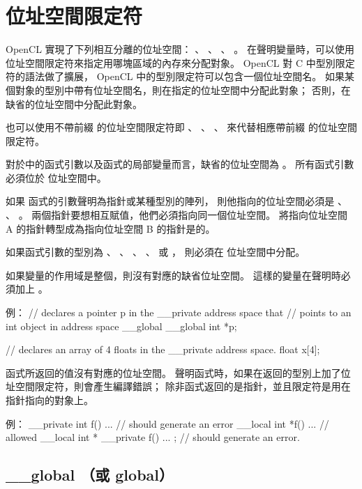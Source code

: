 \section{位址空間限定符}

OpenCL 實現了下列相互分離的位址空間：
 、 、
 、 。
在聲明變量時，可以使用位址空間限定符來指定用哪塊區域的內存來分配對象。
 OpenCL 對 C 中型別限定符的語法做了擴展， OpenCL 中的型別限定符可以包含一個位址空間名。
如果某個對象的型別中帶有位址空間名，則在指定的位址空間中分配此對象；
否則，在缺省的位址空間中分配此對象。

也可以使用不帶前綴 \cqlf{__} 的位址空間限定符即
 、 、 、 
 來代替相應帶前綴 \cqlf{__} 的位址空間限定符。

對於中的函式引數以及函式的局部變量而言，缺省的位址空間為 。
所有函式引數必須位於  位址空間中。

如果  函式的引數聲明為指針或某種型別的陣列，
則他指向的位址空間必須是 、 、 。
兩個指針要想相互賦值，他們必須指向同一個位址空間。
將指向位址空間 A 的指針轉型成為指向位址空間 B 的指針是的。

如果函式引數的型別為
 、 、 、
 、  或 ，
則必須在  位址空間中分配。

如果變量的作用域是整個，則沒有對應的缺省位址空間。
這樣的變量在聲明時必須加上 。

例：
\startclc
// declares a pointer p in the __private address space that
// points to an int object in address space __global
__global int *p;

// declares an array of 4 floats in the __private address space.
float x[4];
\stopclc

函式所返回的值沒有對應的位址空間。
聲明函式時，如果在返回的型別上加了位址空間限定符，則會產生編譯錯誤；
除非函式返回的是指針，並且限定符是用在指針指向的對象上。

例：
\startclc
__private int f() { ... }		// should generate an error
__local int *f() { ... }		// allowed
__local int * __private f() { ... };	// should generate an error.
\stopclc

\subsection{__global （或 global）}

